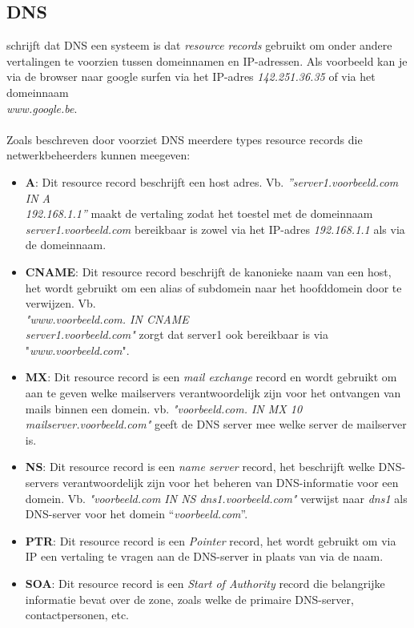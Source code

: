 \documentclass{hogent-article}
\begin{document}
\subsection{DNS}
\textcite{Mockapetris1987} schrijft dat DNS een systeem is dat \textit{resource records} gebruikt om onder andere vertalingen te voorzien tussen domeinnamen en IP-adressen. Als voorbeeld kan je via de browser naar google surfen via het IP-adres \textit{142.251.36.35} of via het domeinnaam\\ \textit{www.google.be}.
\\ \\
Zoals beschreven door \textcite{Mockapetris1987} voorziet DNS meerdere types resource records die netwerkbeheerders kunnen meegeven: 
\begin{itemize}
    \item \textbf{A}: Dit resource record beschrijft een host adres. 
    Vb. \textit{”server1.voorbeeld.com IN A \\192.168.1.1”} maakt de vertaling zodat het toestel met de domeinnaam \textit{server1.voorbeeld.com} bereikbaar is zowel via het IP-adres \textit{192.168.1.1} als via de domeinnaam. 
    \item \textbf{CNAME}: Dit resource record beschrijft de kanonieke naam van een host, het wordt gebruikt om een alias of subdomein naar het hoofddomein door te verwijzen. Vb.\\ \textit{"www.voorbeeld.com. IN CNAME \\server1.voorbeeld.com"} zorgt dat server1 ook bereikbaar is via "\textit{www.voorbeeld.com}".
    \item \textbf{MX}: Dit resource record is een \textit{mail exchange} record en wordt gebruikt om aan te geven welke mailservers verantwoordelijk zijn voor het ontvangen van mails binnen een domein. vb. \textit{"voorbeeld.com. IN MX 10 mailserver.voorbeeld.com"} geeft de DNS server mee welke server de mailserver is.
    \item \textbf{NS}: Dit resource record is een \textit{name server} record, het beschrijft welke DNS-servers verantwoordelijk zijn voor het beheren van DNS-informatie voor een domein. Vb. \textit{"voorbeeld.com IN NS dns1.voorbeeld.com"} verwijst naar \textit{dns1} als DNS-server voor het domein “\textit{voorbeeld.com}”.
    \item \textbf{PTR}: Dit resource record is een \textit{Pointer} record, het wordt gebruikt om via IP een vertaling te vragen aan de DNS-server in plaats van via de naam.
    \item \textbf{SOA}: Dit resource record is een \textit{Start of Authority} record die belangrijke informatie bevat over de zone, zoals welke de primaire DNS-server, contactpersonen, etc.
\end{itemize}
\end{document}
